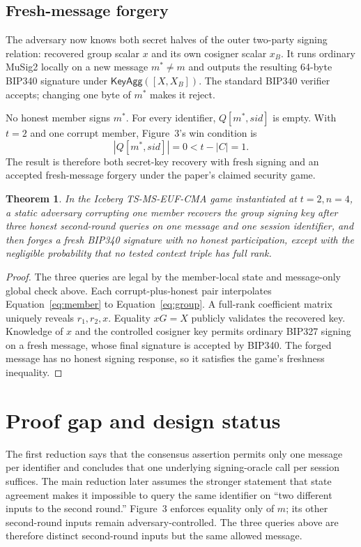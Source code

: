 \documentclass[10pt,a4paper]{article}
\newtheorem{theorem}{Theorem}
\newcommand{\KeyAgg}{\mathsf{KeyAgg}}
\begin{document}
\subsection{Fresh-message forgery}

The adversary now knows both secret halves of the outer two-party signing
relation: recovered group scalar $x$ and its own cosigner scalar $x_B$. It
runs ordinary MuSig2 locally on a new message $m^*\ne m$ and outputs the
resulting 64-byte BIP340 signature under $\KeyAgg([X,X_B])$. The standard
BIP340 verifier accepts; changing one byte of $m^*$ makes it reject.

No honest member signs $m^*$. For every identifier,
$Q[m^*,\mathit{sid}]$ is empty. With $t=2$ and one corrupt member, Figure~3's
win condition is
\[
 |Q[m^*,\mathit{sid}]|=0<t-|C|=1.
\]
The result is therefore both secret-key recovery with fresh signing and an
accepted fresh-message forgery under the paper's claimed security game.

\begin{theorem}
In the Iceberg TS-MS-EUF-CMA game instantiated at $t=2,n=4$, a static
adversary corrupting one member recovers the group signing key after three
honest second-round queries on one message and one session identifier, and
then forges a fresh BIP340 signature with no honest participation, except with
the negligible probability that no tested context triple has full rank.
\end{theorem}

\begin{proof}
The three queries are legal by the member-local state and message-only global
check above. Each corrupt-plus-honest pair interpolates Equation~\eqref{eq:member}
to Equation~\eqref{eq:group}. A full-rank coefficient matrix uniquely reveals
$r_1,r_2,x$. Equality $xG=X$ publicly validates the recovered key. Knowledge
of $x$ and the controlled cosigner key permits ordinary BIP327 signing on a
fresh message, whose final signature is accepted by BIP340. The forged message
has no honest signing response, so it satisfies the game's freshness
inequality.
\end{proof}

\section{Proof gap and design status}

The first reduction says that the consensus assertion permits only one
message per identifier and concludes that one underlying signing-oracle call
per session suffices. The main reduction later assumes the stronger statement
that state agreement makes it impossible to query the same identifier on
``two different inputs to the second round.'' Figure~3 enforces equality only
of $m$; its other second-round inputs remain adversary-controlled. The three
queries above are therefore distinct second-round inputs but the same allowed
message.
\end{document}
